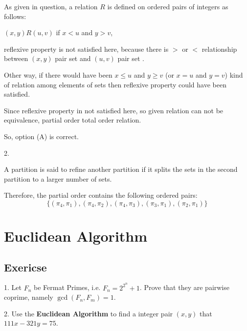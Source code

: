 \documentclass[12pt]{article}
\begin{document}
	As given in question, a relation $R$ is defined on ordered pairs of integers as follows: 
	\begin{center}
		$(x,y) R(u,v)$ if $x < u$ and $y > v$,
	\end{center}  reflexive property is not satisfied here, because there is $>$ or $<$ relationship between $(x ,y)$ pair set and $(u,v)$ pair set . 
	\par Other way, if there would have been $x \leqslant u$ and $y \geqslant v$ (or $x=u$ and $y=v$) kind of relation among elements of sets then reflexive property could have been satisfied. 
	\par Since reflexive property in not satisfied here, so given relation can not be equivalence, partial order total order relation.
	\par So, option (A) is correct.
	\par 
	2. 
		\par A partition is said to refine another partition if it splits the sets in the second partition to a larger number of sets.
		\par Therefore, the partial order contains the following ordered pairs: $$\{(\pi_4,\pi_1),(\pi_4,\pi_2),(\pi_4,\pi_3),(\pi_3,\pi_1),(\pi_2,\pi_1)\}$$

	\section{Euclidean Algorithm}
	\subsection{Exericse}
	1. Let $F_n$ be Fermat Primes, i.e. $F_n=2^{2^n} +1$. Prove that they are 
    pairwise coprime, namely $\gcd(F_n,F_m)=1.$
    \par 
    2. Use the \textbf{Euclidean Algorithm} to find a integer pair $(x,y)$ that 
    $111x-321y=75.$ 
\end{document}
